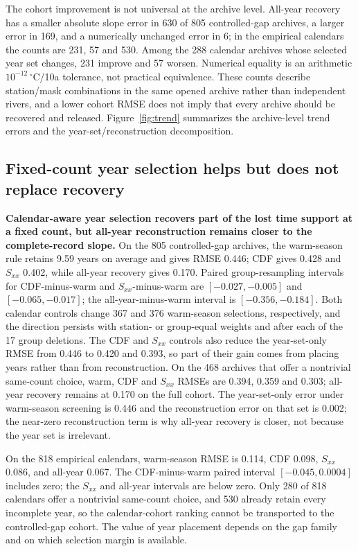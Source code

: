The cohort improvement is not universal at the archive level. All-year recovery has a smaller absolute slope error in 630 of 805 controlled-gap archives, a larger error in 169, and a numerically unchanged error in 6; in the empirical calendars the counts are 231, 57 and 530. Among the 288 calendar archives whose selected year set changes, 231 improve and 57 worsen. Numerical equality is an arithmetic $10^{-12}$\,$^{\circ}$C/10a tolerance, not practical equivalence. These counts describe station/mask combinations in the same opened archive rather than independent rivers, and a lower cohort RMSE does not imply that every archive should be recovered and released. Figure~\ref{fig:trend} summarizes the archive-level trend errors and the year-set/reconstruction decomposition.



\subsection{Fixed-count year selection helps but does not replace recovery}

\textbf{Calendar-aware year selection recovers part of the lost time support at a fixed count, but all-year reconstruction remains closer to the complete-record slope.} On the 805 controlled-gap archives, the warm-season rule retains 9.59 years on average and gives RMSE 0.446; CDF gives 0.428 and $S_{xx}$ 0.402, while all-year recovery gives 0.170. Paired group-resampling intervals for CDF-minus-warm and $S_{xx}$-minus-warm are $[-0.027,-0.005]$ and $[-0.065,-0.017]$; the all-year-minus-warm interval is $[-0.356,-0.184]$. Both calendar controls change 367 and 376 warm-season selections, respectively, and the direction persists with station- or group-equal weights and after each of the 17 group deletions. The CDF and $S_{xx}$ controls also reduce the year-set-only RMSE from 0.446 to 0.420 and 0.393, so part of their gain comes from placing years rather than from reconstruction. On the 468 archives that offer a nontrivial same-count choice, warm, CDF and $S_{xx}$ RMSEs are 0.394, 0.359 and 0.303; all-year recovery remains at 0.170 on the full cohort. The year-set-only error under warm-season screening is 0.446 and the reconstruction error on that set is 0.002; the near-zero reconstruction term is why all-year recovery is closer, not because the year set is irrelevant.

On the 818 empirical calendars, warm-season RMSE is 0.114, CDF 0.098, $S_{xx}$ 0.086, and all-year 0.067. The CDF-minus-warm paired interval $[-0.045,0.0004]$ includes zero; the $S_{xx}$ and all-year intervals are below zero. Only 280 of 818 calendars offer a nontrivial same-count choice, and 530 already retain every incomplete year, so the calendar-cohort ranking cannot be transported to the controlled-gap cohort. The value of year placement depends on the gap family and on which selection margin is available.

